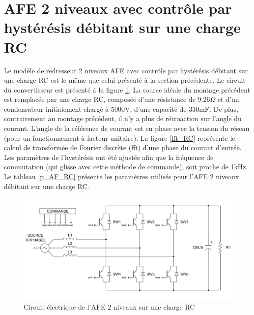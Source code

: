 \clearpage
\section{AFE 2 niveaux avec contrôle par hystérésis débitant sur une charge RC}
Le modèle de redresseur 2 niveaux AFE avec contrôle par hystérésis débitant sur une charge RC est le même que celui présenté à la section précédente. Le circuit du convertisseur est présenté à la figure \ref{circuit_AFE_2L_RC}. La source idéale du montage précédent est remplacée par une charge RC, composée d'une résistance de 9.26$\Omega$ et d'un condensateur initialement chargé à 5000V, d'une capacité de 330mF. De plus, contrairement au montage précédent, il n'y a plus de rétroaction sur l'angle du courant. L'angle de la référence de courant est en phase avec la tension du réseau (pour un fonctionnement à facteur unitaire). La figure \ref{fft_RC} représente le calcul de transformée de Fourier discrète (fft) d'une phase du courant d'entrée. Les paramètres de l'hystérésis ont été ajustés afin que la fréquence de commutation (qui glisse avec cette méthode de commande), soit proche de 1kHz. Le tableau \ref{p_AF_RC} présente les paramètres utilisés pour l'AFE 2 niveaux débitant sur une charge RC.

\begin{figure}[htb]
\centering
\includegraphics[scale=0.6]{fig/AFE_2L_RC.png}
\caption{Circuit électrique de l'AFE 2 niveaux sur une charge RC}
\label{circuit_AFE_2L_RC}
\end{figure}


